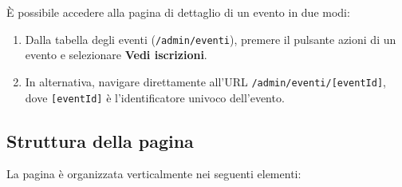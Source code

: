 \documentclass[a4paper,11pt,oneside]{book}
\newcommand{\menuitem}[1]{\textsf{\textbf{#1}}}
\newcommand{\percorso}[1]{\textcolor{namoCyan}{\texttt{#1}}}
\begin{document}
\`E possibile accedere alla pagina di dettaglio di un evento in due modi:

\begin{enumerate}[leftmargin=1.5em]
  \item Dalla tabella degli eventi (\percorso{/admin/eventi}), premere il pulsante azioni di un evento e selezionare \menuitem{Vedi iscrizioni}.
  \item In alternativa, navigare direttamente all'URL \percorso{/admin/eventi/[eventId]}, dove \texttt{[eventId]} \`e l'identificatore univoco dell'evento.
\end{enumerate}

\subsection{Struttura della pagina}

La pagina \`e organizzata verticalmente nei seguenti elementi:
\end{document}
